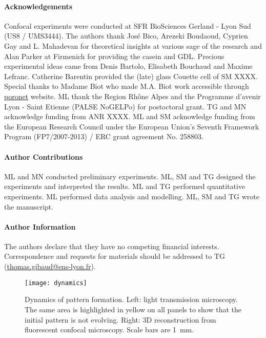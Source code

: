 \documentclass[twocolumn,superscriptaddress,showpacs,preprintnumbers,amsmath,amssymb,prl]{revtex4-1}
\begin{document}


\paragraph*{Acknowledgements}
Confocal experiments were conducted at SFR BioSciences Gerland - Lyon Sud (US8 / UMS3444).
The authors thank José Bico, Arezeki Boudaoud, Cyprien Gay and L. Mahadevan for theoretical insights at various sage of the research and Alan Parker at Firmenich for providing the casein and GDL. 
Precious experimental ideas came from Denis Bartolo, Elisabeth Bouchaud and Maxime Lefranc.
Catherine Barentin provided the (late) glass Couette cell of SM XXXX.
Special thanks to Madame Biot who made M.A. Biot work accessible through \href{http://www.olemiss.edu/sciencenet/poronet/}{poronet} website. 
ML thank the Region Rhône Alpes and the Programme d'avenir Lyon - Saint Etienne (PALSE NoGELPo) for postoctoral grant. 
TG and MN acknowledge funding from ANR XXXX. 
ML and SM acknowledge funding from the European Research Council under the European Union's Seventh Framework Program (FP7/2007-2013) / ERC grant agreement No. 258803.


\paragraph*{Author Contributions}
ML and MN conducted preliminary experiments. ML, SM and TG designed the experiments and interpreted the results. ML and TG performed quantitative experiments. ML performed data analysis and modelling. ML, SM and TG wrote the manuscript.


\paragraph*{Author Information} 
The authors declare that they have no competing financial interests. 
Correspondence and requests for materials should be addressed to TG (\href{mailto:thomas.gibaud@ens-lyon.fr}{thomas.gibaud@ens-lyon.fr}).



\begin{figure}
	\texttt{[image: dynamics]}
	\caption{Dynamics of pattern formation. Left: light transmission microscopy. The same area is highlighted in yellow on all panels to show that the initial pattern is not evolving. Right: 3D reconstruction from fluorescent confocal microscopy. Scale bars are \SI{1}{\milli\metre}.}
	\label{fig:dynamics}
\end{figure}
\end{document}
